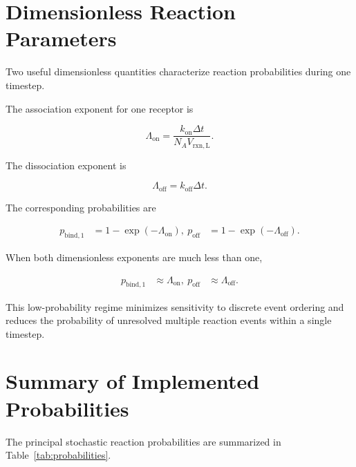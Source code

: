 \documentclass[11pt]{article}
\begin{document}
\section{Dimensionless Reaction Parameters}

Two useful dimensionless quantities characterize reaction probabilities during one timestep.

The association exponent for one receptor is

\begin{equation}
\Lambda_{\mathrm{on}}
=
\frac{
k_{\mathrm{on}}\Delta t
}{
N_A V_{\mathrm{rxn,L}}
}.
\end{equation}

The dissociation exponent is

\begin{equation}
\Lambda_{\mathrm{off}}
=
k_{\mathrm{off}}\Delta t.
\end{equation}

The corresponding probabilities are

\begin{align}
p_{\mathrm{bind},1}
&=
1-\exp(-\Lambda_{\mathrm{on}}),\
p_{\mathrm{off}}
&=
1-\exp(-\Lambda_{\mathrm{off}}).
\end{align}

When both dimensionless exponents are much less than one,

\begin{align}
p_{\mathrm{bind},1}
&\approx
\Lambda_{\mathrm{on}},\
p_{\mathrm{off}}
&\approx
\Lambda_{\mathrm{off}}.
\end{align}

This low-probability regime minimizes sensitivity to discrete event ordering and reduces the probability of unresolved multiple reaction events within a single timestep.

\section{Summary of Implemented Probabilities}

The principal stochastic reaction probabilities are summarized in Table~\ref{tab:probabilities}.
\end{document}
